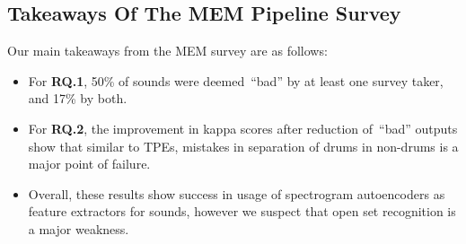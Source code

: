 \documentclass[\main/thesis.tex]{subfiles}
\begin{document}

\subsection{Takeaways Of The MEM Pipeline Survey}
\label{survey2_takeaway}
Our main takeaways from the MEM survey are as follows:
\begin{itemize}
\item For \textbf{RQ.1}, 50\% of sounds were deemed~\enquote{bad} by at least one survey taker, and 17\% by both.
\item For \textbf{RQ.2}, the improvement in kappa scores after reduction of~\enquote{bad} outputs show that similar to TPEs, mistakes in separation of drums in non-drums is a major point of failure. 
\item Overall, these results show success in usage of spectrogram autoencoders as feature extractors for sounds, however we suspect that open set recognition is a major weakness. 
\end{itemize}
\end{document}
